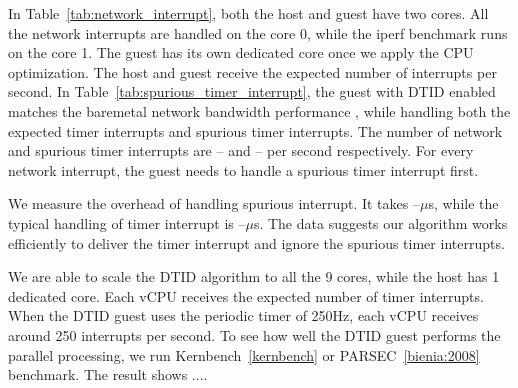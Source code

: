In Table~\ref{tab:network_interrupt}, both the host and guest
have two cores. All the network interrupts are handled on the
core 0, while the iperf benchmark runs on the core 1. The
guest has its own dedicated core once we apply the CPU
optimization. The host and guest receive the expected number
of interrupts per second. In
Table~\ref{tab:spurious_timer_interrupt}, the guest with DTID
enabled matches the baremetal network bandwidth performance ,
while handling both the expected timer interrupts and spurious
timer interrupts. The number of network and spurious timer
interrupts are -- and -- per second respectively. For every
network interrupt, the guest needs to handle a spurious timer
interrupt first.

We measure the overhead of handling spurious interrupt. It
takes --$\mu$s, while the typical handling of timer interrupt
is --$\mu$s. The data suggests our algorithm works efficiently
to deliver the timer interrupt and ignore the spurious timer
interrupts.

We are able to scale the DTID algorithm to all the 9 cores,
while the host has 1 dedicated core. Each vCPU receives the
expected number of timer interrupts. When the DTID guest uses
the periodic timer of 250Hz, each vCPU receives around 250
interrupts per second. To see how well the DTID guest performs
the parallel processing, we run Kernbench~\ref{kernbench} or
PARSEC~\ref{bienia:2008} benchmark. The result shows ....
